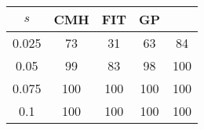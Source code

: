 \centering \begin{tabular}{c|c|c|c|c}
$s$	&CMH	&FIT	&GP	&\sc{Clear}\\\hline
0.025	&73	&31	&63	&84\\
0.05	&99	&83	&98	&100\\
0.075	&100	&100	&100	&100\\
0.1	&100	&100	&100	&100\\
\end{tabular}
